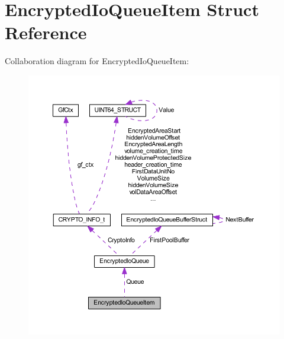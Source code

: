 \hypertarget{struct_encrypted_io_queue_item}{}\section{Encrypted\+Io\+Queue\+Item Struct Reference}
\label{struct_encrypted_io_queue_item}


Collaboration diagram for Encrypted\+Io\+Queue\+Item\+:
\nopagebreak
\begin{figure}[H]
\begin{center}
\leavevmode
\includegraphics[width=350pt]{struct_encrypted_io_queue_item__coll__graph}
\end{center}
\end{figure}
